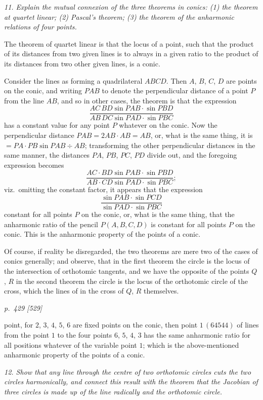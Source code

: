 \documentclass[11pt,a4paper]{article}
\theoremstyle{plain}
\theoremstyle{definition}
\begin{document}
\textit{11. Explain the mutual connexion of the three theorems in conics: (1) the theorem at quartet linear; (2) Pascal's theorem; (3) the theorem of the anharmonic relations of four points.}

The theorem of quartet linear is that the locus of a point, such that the product
of its distances from two given lines is to always in a given ratio to the product of
its distances from two other given lines, is a conic.

Consider the lines as forming a quadrilateral $ABCD$. Then $A$, $B$, $C$, $D$ are points
on the conic, and writing $PAB$ to denote the perpendicular distance of a point $P$
from the line $AB$, and so in other cases, the theorem is that the expression
\[
\frac{AC\,BD\sin PAB \cdot \sin PBD}{AB\,DC\sin PAD\cdot\sin PBC}
\]
has a constant value for any point $P$ whatever on the conic. Now the perpendicular
distance $PAB = 2AB \cdot AB = AB$, or, what is the same thing, it is $= PA \cdot PB \sin PAB \div AB$;
transforming the other perpendicular distances in the same manner, the distances $PA$,
$PB$, $PC$, $PD$ divide out, and the foregoing expression becomes
\[
\frac{AC \cdot BD \sin PAB \cdot \sin PBD}{AB \cdot CD \sin PAD \cdot \sin PBC};
\]
viz.\ omitting the constant factor, it appears that the expression
\[
\frac{\sin PAB \cdot \sin PCD}{\sin PAD \cdot \sin PBC}
\]
constant for all points $P$ on the conic, or, what is the same thing, that the anharmonic
ratio of the pencil $P(A, B, C, D)$ is constant for all points $P$ on the conic. This is
the anharmonic property of the points of a conic.

Of course, if reality be disregarded, the two theorems are mere two of the cases of conics generally; and observe, that in the first theorem the circle is the locus of the intersection of orthotomic tangents, and we have the opposite of the points $Q$, $R$ in the second theorem the circle is the locus of the orthotomic circle of the cross, which the lines of in the cross of $Q$, $R$ themselves.

\clearpage

\bigskip
\textit{p.~429 [529]}
\smallskip

\noindent
point, for $2$, $3$, $4$, $5$, $6$ are fixed points on the conic, then point $1\,(64544)$ of lines from
the point $1$ to the four points $6$, $5$, $4$, $3$ has the same anharmonic ratio for all
positions whatever of the variable point $1$; which is the above-mentioned anharmonic
property of the points of a conic.

\textit{12. Show that any line through the centre of two orthotomic circles cuts the two circles harmonically, and connect this result with the theorem that the Jacobian of three circles is made up of the line radically and the orthotomic circle.}
\end{document}

